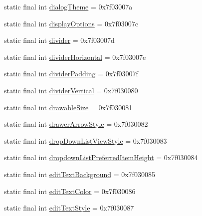 \begin{DoxyCompactItemize}
\item 
static final int \mbox{\hyperlink{classandroid_1_1support_1_1v7_1_1appcompat_1_1_r_1_1attr_ab19486b0733aa673ad9200e26d9d75ff}{dialog\+Theme}} = 0x7f03007a
\item 
static final int \mbox{\hyperlink{classandroid_1_1support_1_1v7_1_1appcompat_1_1_r_1_1attr_a34a85afaf262f746407000a5e07dd1bf}{display\+Options}} = 0x7f03007c
\item 
static final int \mbox{\hyperlink{classandroid_1_1support_1_1v7_1_1appcompat_1_1_r_1_1attr_ab828acf2ffc5acfe50ab18caeabbb5dd}{divider}} = 0x7f03007d
\item 
static final int \mbox{\hyperlink{classandroid_1_1support_1_1v7_1_1appcompat_1_1_r_1_1attr_a6f8ba93dda01b4ce5bf62f4e950a8700}{divider\+Horizontal}} = 0x7f03007e
\item 
static final int \mbox{\hyperlink{classandroid_1_1support_1_1v7_1_1appcompat_1_1_r_1_1attr_a68d39d7b28b9b24e4dd92b6e761413ee}{divider\+Padding}} = 0x7f03007f
\item 
static final int \mbox{\hyperlink{classandroid_1_1support_1_1v7_1_1appcompat_1_1_r_1_1attr_a7cc67a6baac85daf6ea6800596b701c9}{divider\+Vertical}} = 0x7f030080
\item 
static final int \mbox{\hyperlink{classandroid_1_1support_1_1v7_1_1appcompat_1_1_r_1_1attr_ae9b180271adb30a594bdee8324935397}{drawable\+Size}} = 0x7f030081
\item 
static final int \mbox{\hyperlink{classandroid_1_1support_1_1v7_1_1appcompat_1_1_r_1_1attr_ad95655c95f6510c592533a0b11794ca0}{drawer\+Arrow\+Style}} = 0x7f030082
\item 
static final int \mbox{\hyperlink{classandroid_1_1support_1_1v7_1_1appcompat_1_1_r_1_1attr_a64e8f8d2fe3975f4412601919958a9b4}{drop\+Down\+List\+View\+Style}} = 0x7f030083
\item 
static final int \mbox{\hyperlink{classandroid_1_1support_1_1v7_1_1appcompat_1_1_r_1_1attr_a5ec5e31cf78fb18fe640dde5168b1ae4}{dropdown\+List\+Preferred\+Item\+Height}} = 0x7f030084
\item 
static final int \mbox{\hyperlink{classandroid_1_1support_1_1v7_1_1appcompat_1_1_r_1_1attr_a405d67c37734e38d5b68d3097f4e08e9}{edit\+Text\+Background}} = 0x7f030085
\item 
static final int \mbox{\hyperlink{classandroid_1_1support_1_1v7_1_1appcompat_1_1_r_1_1attr_a3ef0f5f320b70fe255067409b7ef5a17}{edit\+Text\+Color}} = 0x7f030086
\item 
static final int \mbox{\hyperlink{classandroid_1_1support_1_1v7_1_1appcompat_1_1_r_1_1attr_adb21f96a96e592e622d373cf62cb5b55}{edit\+Text\+Style}} = 0x7f030087

\end{DoxyCompactItemize}
